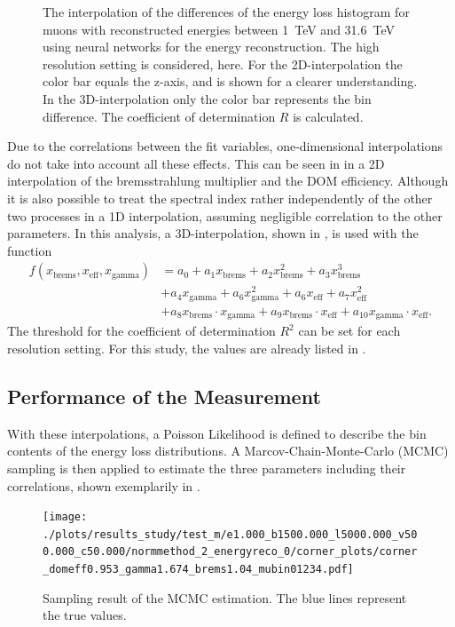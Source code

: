 \begin{figure}
\begin{subfigure}{0.47\textwidth}
        \label{fig:study_interpol_3d_show}
    \end{subfigure}
    \caption{The interpolation of the differences of the energy loss histogram for muons with reconstructed energies between \SI{1}{TeV} and \SI{31.6}{TeV} using neural networks for the energy reconstruction. The high resolution setting is considered, here. For the 2D-interpolation the color bar equals the z-axis, and is shown for a clearer understanding. In the 3D-interpolation only the color bar represents the bin difference.
    The coefficient of determination $R$ is calculated.}
    \label{fig:study_interpol_show}
\end{figure}

Due to the correlations between the fit variables, one-dimensional interpolations do not take into account all these effects.
This can be seen in  in a 2D interpolation of the bremsstrahlung multiplier and the DOM efficiency.
Although it is also possible to treat the spectral index rather independently of the other two processes in a 1D interpolation, assuming negligible correlation to the other parameters.
In this analysis, a 3D-interpolation, shown in , is used with the function
\begin{align}
    f(x_{\text{brems}}, x_{\text{eff}}, x_{\text{gamma}}) 
        &= a_0
        + a_1 x_{\text{brems}} + a_2 x_{\text{brems}}^2 + a_3 x_{\text{brems}}^3 \nonumber \\
        &+ a_4 x_{\text{gamma}} + a_6 x_{\text{gamma}}^2
        + a_6 x_{\text{eff}} + a_7 x_{\text{eff}}^2 \\
        &+ a_8 x_{\text{brems}} \cdot x_{\text{gamma}}
        + a_9 x_{\text{brems}} \cdot x_{\text{eff}}
        + a_{10} x_{\text{gamma}} \cdot x_{\text{eff}} .\nonumber
\end{align}
The threshold for the coefficient of determination $R^2$ can be set for each resolution setting.
For this study, the values are already listed in .

%

\subsection{Performance of the Measurement}

With these interpolations, a Poisson Likelihood is defined to describe the bin contents of the energy loss distributions.
A Marcov-Chain-Monte-Carlo (MCMC) sampling is then applied to estimate the three parameters including their correlations, shown exemplarily in .
\begin{figure}
    \centering
    \texttt{[image: ./plots/results\_study/test\_m/e1.000\_b1500.000\_l5000.000\_v500.000\_c50.000/normmethod\_2\_energyreco\_0/corner\_plots/corner\_domeff0.953\_gamma1.674\_brems1.04\_mubin01234.pdf]}
    \caption{Sampling result of the MCMC estimation. The blue lines represent the true values.}
    \label{fig:study_mcmc_show}
\end{figure}

